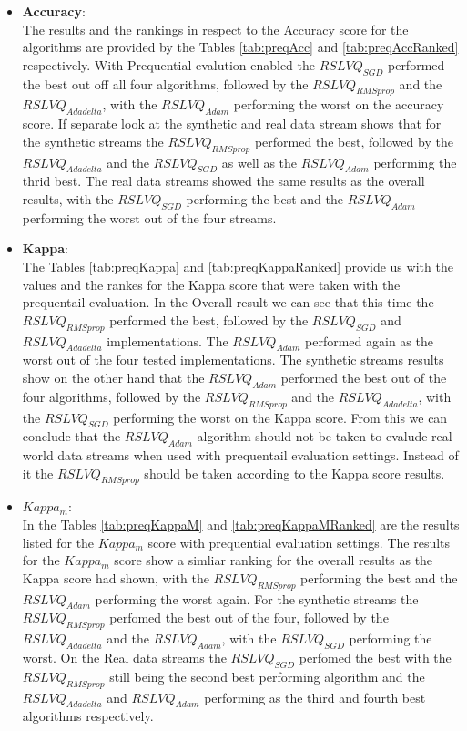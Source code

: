 \documentclass[12pt,oneside,a4paper,parskip]{scrbook}
\begin{document}
\begin{itemize}
  \item \textbf{Accuracy}: \\
  The results and the rankings in respect to the Accuracy score for the algorithms are provided by the Tables \ref{tab:preqAcc} and \ref{tab:preqAccRanked}
  respectively.
  With Prequential evalution enabled the $RSLVQ_\textit{SGD}$ performed the best out off all four algorithms, followed by the 
  $RSLVQ_\textit{RMSprop}$ and the $RSLVQ_\textit{Adadelta}$, with the $RSLVQ_\textit{Adam}$ performing the worst on the accuracy score.
  If separate look at the synthetic and real data stream shows that for the synthetic streams the $RSLVQ_\textit{RMSprop}$ performed the best,
  followed by the $RSLVQ_\textit{Adadelta}$ and the $RSLVQ_\textit{SGD}$ as well as the $RSLVQ_\textit{Adam}$ performing the thrid best.
  The real data streams showed the same results as the overall results, with the $RSLVQ_\textit{SGD}$ performing the best and the $RSLVQ_\textit{Adam}$ performing
  the worst out of the four streams.

  \item \textbf{Kappa}: \\
  The Tables \ref{tab:preqKappa} and \ref{tab:preqKappaRanked} provide us with the values and the rankes for the Kappa score that were taken with the
  prequentail evaluation.
  In the Overall result we can see that this time the $RSLVQ_\textit{RMSprop}$ performed the best, followed by the $RSLVQ_\textit{SGD}$ 
  and $RSLVQ_\textit{Adadelta}$ implementations. The $RSLVQ_\textit{Adam}$ performed again as the worst out of the four tested implementations.
  The synthetic streams results show on the other hand that the $RSLVQ_\textit{Adam}$ performed the best out of the four algorithms, followed by 
  the $RSLVQ_\textit{RMSprop}$ and the $RSLVQ_\textit{Adadelta}$, with the $RSLVQ_\textit{SGD}$ performing the worst on the Kappa score.
  From this we can conclude that the $RSLVQ_\textit{Adam}$ algorithm should not be taken to evalude real world data streams when used with
  prequentail evaluation settings. Instead of it the $RSLVQ_\textit{RMSprop}$ should be taken according to the Kappa score results.
  
  \item \textbf{$Kappa_m$}: \\
  In the Tables \ref{tab:preqKappaM} and \ref{tab:preqKappaMRanked} are the results listed for the $Kappa_m$ score with prequential evaluation settings.
  The results for the $Kappa_m$ score show a simliar ranking for the overall results as the Kappa score had shown, with the 
  $RSLVQ_\textit{RMSprop}$ performing the best and the $RSLVQ_\textit{Adam}$ performing the worst again.
  For the synthetic streams the $RSLVQ_\textit{RMSprop}$ perfomed the best out of the four, followed by the $RSLVQ_\textit{Adadelta}$ and the
  $RSLVQ_\textit{Adam}$, with the $RSLVQ_\textit{SGD}$ performing the worst.
  On the Real data streams the $RSLVQ_\textit{SGD}$ perfomed the best with the $RSLVQ_\textit{RMSprop}$ still being the second best performing
  algorithm and the $RSLVQ_\textit{Adadelta}$ and $RSLVQ_\textit{Adam}$ performing as the third and fourth best algorithms respectively.
  

\end{itemize}
\end{document}
